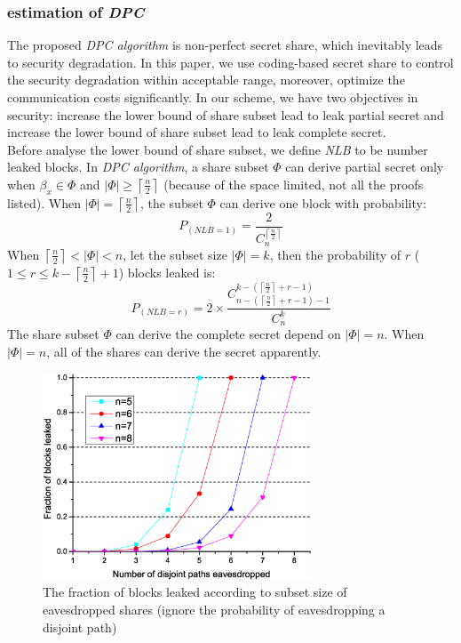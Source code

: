 \documentclass[nocopyrightspace,9pt]{sigplanconf}
\newcommand\lanceil[2]{\left\lceil\frac{#1}{#2}\right\rceil}
\begin{document}
\subsubsection*{estimation of \textit{DPC}}
The proposed \textit{DPC algorithm} is non-perfect secret share, which inevitably leads to
security degradation. In this paper, we use coding-based secret share to control the security
degradation within acceptable range, moreover, optimize the communication costs significantly.
In our scheme, we have two objectives in security: increase the lower bound of share subset lead to
leak partial secret and increase the lower bound of share subset lead to leak complete secret.\\

Before analyse the lower bound of share subset, we define \textit{NLB} to be number leaked blocks.
In \textit{DPC algorithm}, a share subset $\Phi$ can derive partial secret only when $\beta_x \in \Phi$
and $|\Phi|\geq \lanceil{n}{2}$ (because of the space limited, not all the proofs listed).
When $|\Phi|= \lanceil{n}{2}$, the subset $\Phi$ can derive one block with probability:
\begin{equation}
  P_{(NLB=1)}=\frac{2}{C_n^{\lanceil{n}{2}}}
\end{equation}
When $\lanceil{n}{2}<|\Phi|<n$, let the subset size $|\Phi|=k$, then the probability of $r$
($1\leq r \leq {k-\lanceil{n}{2}+1}$) blocks leaked is:
\begin{equation}
  P_{(NLB=r)}=2\times \frac{C_{n-(\lanceil{n}{2}+r-1)-1}^{k-(\lanceil{n}{2}+r-1)}}{C_n^k}
\end{equation}
The share subset $\Phi$ can derive the complete secret depend on $|\Phi|=n$.
When $|\Phi|=n$, all of the shares can derive the secret apparently.

\begin{figure}[htbp]
\centering
\includegraphics[width=80mm]{sdf.eps}
\caption{The fraction of blocks leaked according to subset size
of eavesdropped shares (ignore the probability of eavesdropping a disjoint path)}
\label{fig:nlb}
\end{figure}
\end{document}
